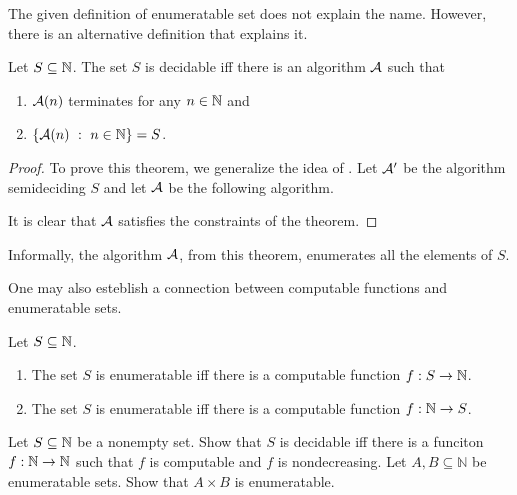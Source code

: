 The given definition of enumeratable set does not explain the name. However,
there is an alternative definition that explains it.
\begin{theorem}
  Let $S \subseteq \mathbb{N}$. The set $S$ is decidable iff there is an algorithm
  $\mathcal{A}$ such that
  \begin{enumerate}
    \item $\mathcal{A}(n)$ terminates for any $n \in \mathbb{N}$ and
    \item $\set[n \in  \N]{\Algorithm{A}(n)} = S$.
  \end{enumerate}
\end{theorem}
\begin{proof}
  To prove this theorem, we generalize the idea of
  .
  Let $\mathcal{A}'$ be the algorithm semideciding $S$ and
  let $\mathcal{A}$ be the following algorithm.
  \begin{algorithm}
      \begin{algorithmic}[1]
                \Parallel
                \EndParallel
              \EndWhile
          \EndFunction
      \end{algorithmic}
  \end{algorithm}

  It is clear that $\mathcal{A}$ satisfies the constraints of the theorem.
\end{proof}
Informally, the algorithm $\mathcal{A}$, from this theorem, enumerates
all the elements of $S$.

One may also esteblish a connection between computable functions and
enumeratable sets.
\begin{theorem}
  Let $S \subseteq \mathbb{N}$.
  \begin{enumerate}
    \item The set $S$ is enumeratable iff there is a computable function
      $f : S \to \mathbb{N}$.
    \item The set $S$ is enumeratable iff there is a computable function
      $f : \mathbb{N} \to S$.
  \end{enumerate}
\end{theorem}

\begin{chapterendexercises}
  \exercise Let $S \subseteq \mathbb{N}$ be a nonempty set.
    Show that $S$ is decidable iff there is a funciton $f : \mathbb{N} \to \mathbb{N}$ such
    that $f$ is computable and $f$ is nondecreasing.
  \exercise Let $A, B \subseteq \mathbb{N}$ be enumeratable sets. Show that
    $A \times B$ is enumeratable.
\end{chapterendexercises}
